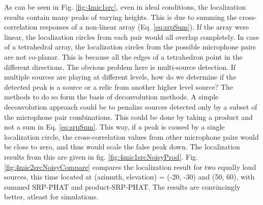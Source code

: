 As can be seen in Fig. \ref{fig:4mic1src}, even in ideal conditions, the localization results contain many peaks of varying heights. This is due to summing the cross-correlation responses of a non-linear array (Eq. \ref{eq:srpSum}). If the array were linear, the localization circles from each pair would all overlap completely. In case of a tetrahedral array, the localization circles from the possible microphone pairs are not co-planar. This is because all the edges of a tetrahedron point in the different directions. The obvious problem here is multi-source detection. If multiple sources are playing at different levels, how do we determine if the detected peak is a source or a relic from another higher level source? The methods to do so form the basis of deconvolution methods. 
A simple deconvolution approach could be to penalize sources detected only by a subset of the microphone pair combinations. This could be done by taking a product and not a sum in Eq. \ref{eq:srpSum}. This way, if a peak is caused by a single localization circle, the cross-correlation values from other microphone pairs would be close to zero, and thus would scale the false peak down. The localization results from this are given in fig. \ref{fig:4mic1srcNoisyProd}. Fig. \ref{fig:4mic2srcNoisyCompare} compares the localization result for two equally loud sources, this time located at (azimuth, elevation) = (-20, -30) and (50, 60), with summed SRP-PHAT and product-SRP-PHAT. The results are convincingly better, atleast for simulations.  

